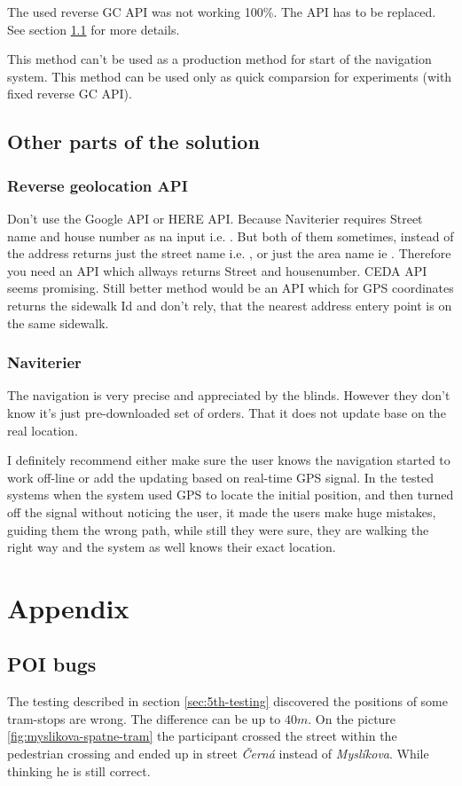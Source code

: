\documentclass[11pt,oneside,a4paper]{book}
\begin{document}
				The used reverse GC API was not working 100\%. The API has to be replaced. See section \ref{subsec:reverse-gc-api} for more details.
							
				This method can't be used as a production method for start of the navigation system.
				This method can be used only as quick comparsion for experiments (with fixed reverse GC API).
		
		\section{Other parts of the solution}	
			\subsection{Reverse geolocation API}
				\label{subsec:reverse-gc-api}
				Don't use the Google API or HERE API. Because Naviterier requires Street name and house number as na input i.e. . But both of them sometimes, instead of the address  returns just the street name i.e. , or just the area name ie . Therefore you need an API which allways returns Street and housenumber. CEDA API seems promising. Still better method would be an API which for GPS coordinates returns the sidewalk Id and don't rely, that the nearest address entery point is on the same sidewalk.	
			\subsection{Naviterier}
				The navigation is very precise and appreciated by the blinds. However they don't know it's just pre-downloaded set of orders. That it does not update base on the real location.
				
				I definitely recommend either make sure the user knows the navigation started to work off-line or add the updating based on real-time GPS signal. In the tested systems when the system used GPS to locate the initial position, and then turned off the signal without noticing the user, it made the users make huge mistakes, guiding them the wrong path, while still they were sure, they are walking the right way and the system as well knows their exact location.
			
	
	\chapter{Appendix}
		\section{POI bugs}
			The testing described in section \ref{sec:5th-testing} discovered the positions of some tram-stops are wrong. The difference can be up to $40m$. On the picture \ref{fig:myslikova-spatne-tram} the participant crossed the street within the pedestrian crossing and ended up in street \emph{Černá} instead of \emph{Myslíkova}. While thinking he is still correct.
			
\end{document}
